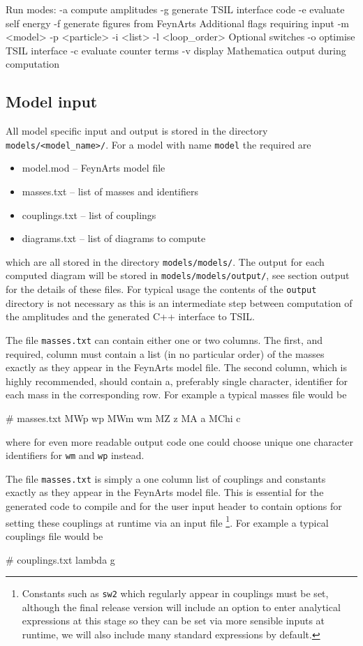 \begin{lstterm}
Run modes:
-a 		compute amplitudes
-g		generate TSIL interface code
-e		evaluate self energy
-f		generate figures from FeynArts
Additional flags requiring input
-m <model> 
-p <particle>
-i  <list>
-l <loop_order>
Optional switches
-o		optimise TSIL interface
-c		evaluate counter terms
-v		display Mathematica output during computation
\end{lstterm}


\subsection{Model input}

All model specific input and output is stored in the directory \lstinline{models/<model_name>/}.  For a model with name \lstinline{model} the required are
\begin{itemize}
\item model.mod  -- FeynArts model file
\item masses.txt -- list of masses and identifiers
\item couplings.txt -- list of couplings
\item diagrams.txt -- list of diagrams to compute
\end{itemize}
which are all stored in the directory \lstinline{models/models/}.  The output for each computed diagram will be stored in \lstinline{models/models/output/}, see section output for the details of these files.  For typical usage the contents of the \lstinline{output} directory is not necessary as this is an intermediate step between computation of the amplitudes and the generated C++ interface to TSIL.

The file \lstinline{masses.txt} can contain either one or two columns.  The first, and required, column must contain a list (in no particular order) of the masses exactly as they appear in the FeynArts model file.  The second column, which is highly recommended, should contain a, preferably single character, identifier for each mass in the corresponding row.  For example a typical masses file would be
\begin{lstterm}
# masses.txt
MWp          wp
MWm          wm
MZ           z
MA           a
MChi	       c
\end{lstterm}
where for even more readable output code one could choose unique one character identifiers for \lstinline{wm} and \lstinline{wp} instead.

The file \lstinline{masses.txt} is simply a one column list of couplings and constants exactly as they appear in the FeynArts model file.  This is essential for the generated code to compile and for the user input header to contain options for setting these couplings at runtime via an input file \footnote{Constants such as \lstinline{sw2} which regularly appear in couplings must be set, although the final release version will include an option to enter analytical expressions at this stage so they can be set via more sensible inputs at runtime, we will also include many standard expressions by default.}.  For example a typical couplings file would be
\begin{lstterm}
# couplings.txt
lambda
g
\end{lstterm}

